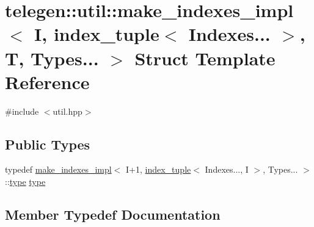 \hypertarget{structtelegen_1_1util_1_1make__indexes__impl_3_01I_00_01index__tuple_3_01Indexes_8_8_8_01_4_00_01T_00_01Types_8_8_8_01_4}{}\section{telegen\+:\+:util\+:\+:make\+\_\+indexes\+\_\+impl$<$ I, index\+\_\+tuple$<$ Indexes... $>$, T, Types... $>$ Struct Template Reference}
\label{structtelegen_1_1util_1_1make__indexes__impl_3_01I_00_01index__tuple_3_01Indexes_8_8_8_01_4_00_01T_00_01Types_8_8_8_01_4}


{\ttfamily \#include $<$util.\+hpp$>$}

\subsection*{Public Types}
\begin{DoxyCompactItemize}
\item 
typedef \hyperlink{structtelegen_1_1util_1_1make__indexes__impl}{make\+\_\+indexes\+\_\+impl}$<$ I+1, \hyperlink{structtelegen_1_1util_1_1index__tuple}{index\+\_\+tuple}$<$ Indexes..., I $>$, Types... $>$\+::\hyperlink{structtelegen_1_1util_1_1make__indexes__impl_3_01I_00_01index__tuple_3_01Indexes_8_8_8_01_4_00_01T_00_01Types_8_8_8_01_4_a5046a04e998e0bd21d60e07ed6ad6b0e}{type} \hyperlink{structtelegen_1_1util_1_1make__indexes__impl_3_01I_00_01index__tuple_3_01Indexes_8_8_8_01_4_00_01T_00_01Types_8_8_8_01_4_a5046a04e998e0bd21d60e07ed6ad6b0e}{type}
\end{DoxyCompactItemize}


\subsection{Member Typedef Documentation}
\mbox{\label{structtelegen_1_1util_1_1make__indexes__impl_3_01I_00_01index__tuple_3_01Indexes_8_8_8_01_4_00_01T_00_01Types_8_8_8_01_4_a5046a04e998e0bd21d60e07ed6ad6b0e}} 
